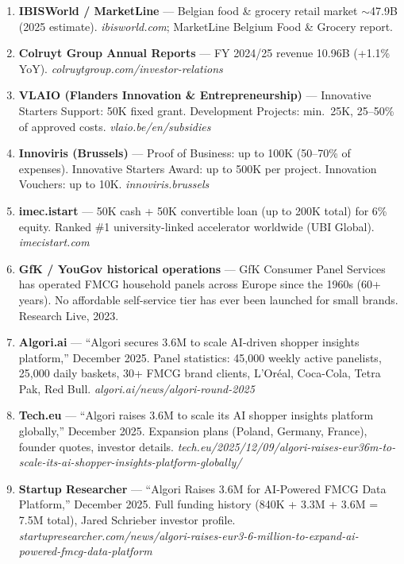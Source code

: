 \documentclass[11pt,a4paper]{article}
\begin{document}
\begin{enumerate}[leftmargin=1.5em, itemsep=2pt, font=\small]
  \item[\textbf{[17]}] \textbf{IBISWorld / MarketLine} --- Belgian food \& grocery retail market $\sim$\texteuro{}47.9B (2025 estimate). \textit{ibisworld.com}; MarketLine Belgium Food \& Grocery report.
  \item[\textbf{[18]}] \textbf{Colruyt Group Annual Reports} --- FY 2024/25 revenue \texteuro{}10.96B (+1.1\% YoY). \textit{colruytgroup.com/investor-relations}
  \item[\textbf{[19]}] \textbf{VLAIO (Flanders Innovation \& Entrepreneurship)} --- Innovative Starters Support: \texteuro{}50K fixed grant. Development Projects: min.\ \texteuro{}25K, 25--50\% of approved costs. \textit{vlaio.be/en/subsidies}
  \item[\textbf{[20]}] \textbf{Innoviris (Brussels)} --- Proof of Business: up to \texteuro{}100K (50--70\% of expenses). Innovative Starters Award: up to \texteuro{}500K per project. Innovation Vouchers: up to \texteuro{}10K. \textit{innoviris.brussels}
  \item[\textbf{[21]}] \textbf{imec.istart} --- \texteuro{}50K cash + \texteuro{}50K convertible loan (up to \texteuro{}200K total) for 6\% equity. Ranked \#1 university-linked accelerator worldwide (UBI Global). \textit{imecistart.com}
  \item[\textbf{[22]}] \textbf{GfK / YouGov historical operations} --- GfK Consumer Panel Services has operated FMCG household panels across Europe since the 1960s (60+ years). No affordable self-service tier has ever been launched for small brands. Research Live, 2023.
  \item[\textbf{[23]}] \textbf{Algori.ai} --- ``Algori secures \texteuro{}3.6M to scale AI-driven shopper insights platform,'' December 2025. Panel statistics: 45,000 weekly active panelists, 25,000 daily baskets, 30+ FMCG brand clients, L'Or\'{e}al, Coca-Cola, Tetra Pak, Red Bull. \textit{algori.ai/news/algori-round-2025}
  \item[\textbf{[24]}] \textbf{Tech.eu} --- ``Algori raises \texteuro{}3.6M to scale its AI shopper insights platform globally,'' December 2025. Expansion plans (Poland, Germany, France), founder quotes, investor details. \textit{tech.eu/2025/12/09/algori-raises-eur36m-to-scale-its-ai-shopper-insights-platform-globally/}
  \item[\textbf{[25]}] \textbf{Startup Researcher} --- ``Algori Raises \texteuro{}3.6M for AI-Powered FMCG Data Platform,'' December 2025. Full funding history (\texteuro{}840K + \texteuro{}3.3M + \texteuro{}3.6M = \texteuro{}7.5M total), Jared Schrieber investor profile. \textit{startupresearcher.com/news/algori-raises-eur3-6-million-to-expand-ai-powered-fmcg-data-platform}

\end{enumerate}
\end{document}
